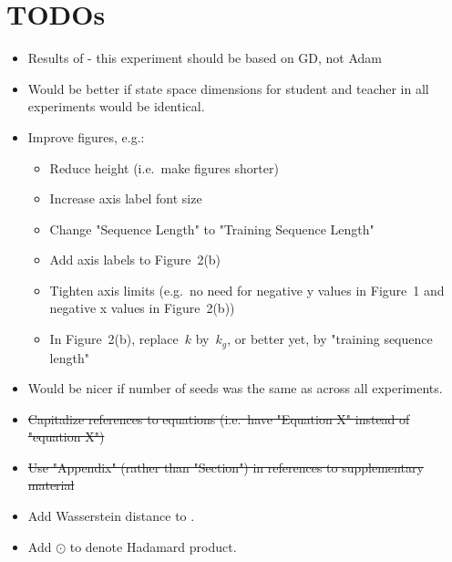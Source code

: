 \section{TODOs}
\begin{itemize}
    \item Results of  -  this experiment should be
    based on GD, not Adam
    \item Would be better if state space dimensions for student and teacher in all experiments would be identical.
    \item Improve figures, e.g.:
    \begin{itemize}
    \item Reduce height (i.e.~make figures shorter)
    \item Increase axis label font size
    \item Change "Sequence Length" to "Training Sequence Length"
    \item Add axis labels to Figure~2(b)
    \item Tighten axis limits (e.g.~no need for negative y values in Figure~1 and negative x values in Figure~2(b))
    \item In Figure~2(b), replace~$k$ by~$k_g$, or better yet, by "training sequence length"
    \end{itemize}
    \item Would be nicer if number of seeds was the same as across all experiments.
    \item \st{Capitalize references to equations (i.e.~have "Equation X" instead of "equation X")}
    \item \st{Use "Appendix" (rather than "Section") in references to supplementary material}
    \item Add Wasserstein distance to .
    \item Add $\odot$ to denote Hadamard product.
\end{itemize}


